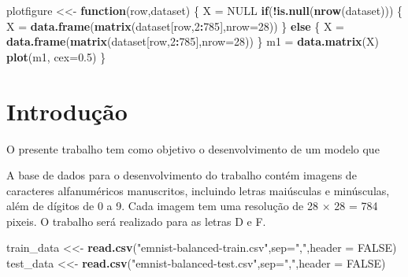 \documentclass[
]{article}
\newenvironment{Shaded}{\begin{snugshade}}{\end{snugshade}}
\newcommand{\AttributeTok}[1]{\textcolor[rgb]{0.13,0.29,0.53}{#1}}
\newcommand{\ConstantTok}[1]{\textcolor[rgb]{0.56,0.35,0.01}{#1}}
\newcommand{\ControlFlowTok}[1]{\textcolor[rgb]{0.13,0.29,0.53}{\textbf{#1}}}
\newcommand{\DecValTok}[1]{\textcolor[rgb]{0.00,0.00,0.81}{#1}}
\newcommand{\FloatTok}[1]{\textcolor[rgb]{0.00,0.00,0.81}{#1}}
\newcommand{\FunctionTok}[1]{\textcolor[rgb]{0.13,0.29,0.53}{\textbf{#1}}}
\newcommand{\NormalTok}[1]{#1}
\newcommand{\OtherTok}[1]{\textcolor[rgb]{0.56,0.35,0.01}{#1}}
\newcommand{\SpecialCharTok}[1]{\textcolor[rgb]{0.81,0.36,0.00}{\textbf{#1}}}
\newcommand{\StringTok}[1]{\textcolor[rgb]{0.31,0.60,0.02}{#1}}
\begin{document}
\begin{Shaded}
\begin{Highlighting}[]
\NormalTok{plotfigure }\OtherTok{\textless{}\textless{}{-}} \ControlFlowTok{function}\NormalTok{(row,dataset)}
\NormalTok{\{}
\NormalTok{  X }\OtherTok{=} \ConstantTok{NULL}
  \ControlFlowTok{if}\NormalTok{(}\SpecialCharTok{!}\FunctionTok{is.null}\NormalTok{(}\FunctionTok{nrow}\NormalTok{(dataset)))}
\NormalTok{  \{}
\NormalTok{    X }\OtherTok{=} \FunctionTok{data.frame}\NormalTok{(}\FunctionTok{matrix}\NormalTok{(dataset[row,}\DecValTok{2}\SpecialCharTok{:}\DecValTok{785}\NormalTok{],}\AttributeTok{nrow=}\DecValTok{28}\NormalTok{))}
\NormalTok{  \}}
  \ControlFlowTok{else}
\NormalTok{  \{}
\NormalTok{    X }\OtherTok{=} \FunctionTok{data.frame}\NormalTok{(}\FunctionTok{matrix}\NormalTok{(dataset[row,}\DecValTok{2}\SpecialCharTok{:}\DecValTok{785}\NormalTok{],}\AttributeTok{nrow=}\DecValTok{28}\NormalTok{))}
\NormalTok{  \}}
\NormalTok{  m1 }\OtherTok{=} \FunctionTok{data.matrix}\NormalTok{(X)}
  \FunctionTok{plot}\NormalTok{(m1, }\AttributeTok{cex=}\FloatTok{0.5}\NormalTok{)}
\NormalTok{\}}
\end{Highlighting}
\end{Shaded}

\hypertarget{introduuxe7uxe3o}{%
\section{Introdução}\label{introduuxe7uxe3o}}

O presente trabalho tem como objetivo o desenvolvimento de um modelo que

A base de dados para o desenvolvimento do trabalho contém imagens de
caracteres alfanuméricos manuscritos, incluindo letras maiúsculas e
minúsculas, além de dígitos de 0 a 9. Cada imagem tem uma resolução de
28 × 28 = 784 pixeis. O trabalho será realizado para as letras D e F.

\begin{Shaded}
\begin{Highlighting}[]
\NormalTok{train\_data }\OtherTok{\textless{}\textless{}{-}} \FunctionTok{read.csv}\NormalTok{(}\StringTok{"emnist{-}balanced{-}train.csv"}\NormalTok{,}\AttributeTok{sep=}\StringTok{","}\NormalTok{,}\AttributeTok{header =} \ConstantTok{FALSE}\NormalTok{)}
\NormalTok{test\_data }\OtherTok{\textless{}\textless{}{-}} \FunctionTok{read.csv}\NormalTok{(}\StringTok{"emnist{-}balanced{-}test.csv"}\NormalTok{,}\AttributeTok{sep=}\StringTok{","}\NormalTok{,}\AttributeTok{header =} \ConstantTok{FALSE}\NormalTok{)}
\end{Highlighting}
\end{Shaded}
\end{document}
